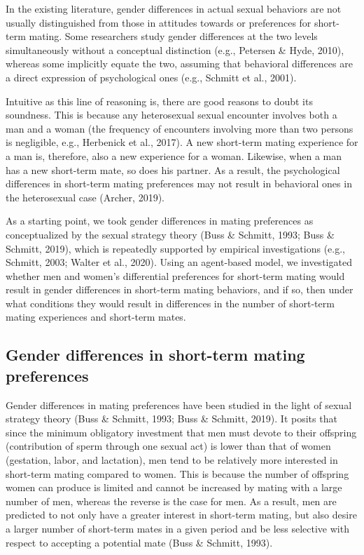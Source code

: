 \documentclass[
  11pt,
]{article}
\begin{document}
In the existing literature, gender differences in actual sexual
behaviors are not usually distinguished from those in attitudes towards
or preferences for short-term mating. Some researchers study gender
differences at the two levels simultaneously without a conceptual
distinction (e.g., Petersen \& Hyde, 2010), whereas some implicitly
equate the two, assuming that behavioral differences are a direct
expression of psychological ones (e.g., Schmitt et al., 2001).

Intuitive as this line of reasoning is, there are good reasons to doubt
its soundness. This is because any heterosexual sexual encounter
involves both a man and a woman (the frequency of encounters involving
more than two persons is negligible, e.g., Herbenick et al., 2017). A
new short-term mating experience for a man is, therefore, also a new
experience for a woman. Likewise, when a man has a new short-term mate,
so does his partner. As a result, the psychological differences in
short-term mating preferences may not result in behavioral ones in the
heterosexual case (Archer, 2019).

As a starting point, we took gender differences in mating preferences as
conceptualized by the sexual strategy theory (Buss \& Schmitt, 1993;
Buss \& Schmitt, 2019), which is repeatedly supported by empirical
investigations (e.g., Schmitt, 2003; Walter et al., 2020). Using an
agent-based model, we investigated whether men and women's differential
preferences for short-term mating would result in gender differences in
short-term mating behaviors, and if so, then under what conditions they
would result in differences in the number of short-term mating
experiences and short-term mates.

\hypertarget{gender-differences-in-short-term-mating-preferences}{%
\subsection{Gender differences in short-term mating
preferences}\label{gender-differences-in-short-term-mating-preferences}}

Gender differences in mating preferences have been studied in the light
of sexual strategy theory (Buss \& Schmitt, 1993; Buss \& Schmitt,
2019). It posits that since the minimum obligatory investment that men
must devote to their offspring (contribution of sperm through one sexual
act) is lower than that of women (gestation, labor, and lactation), men
tend to be relatively more interested in short-term mating compared to
women. This is because the number of offspring women can produce is
limited and cannot be increased by mating with a large number of men,
whereas the reverse is the case for men. As a result, men are predicted
to not only have a greater interest in short-term mating, but also
desire a larger number of short-term mates in a given period and be less
selective with respect to accepting a potential mate (Buss \& Schmitt,
1993).
\end{document}
